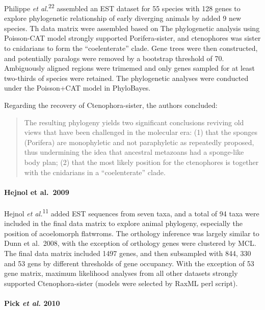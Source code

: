 \documentclass[]{article}
\let\oldparagraph\paragraph
\renewcommand{\paragraph}[1]{\oldparagraph{#1}\mbox{}}
\begin{document}
Philippe \emph{et al.}\textsuperscript{22} assembled an EST dataset for
55 species with 128 genes to explore phylogenetic relationship of early
diverging animals by added 9 new species. Th data matrix were assembled
based on The phylogenetic analysis using Poisson-CAT model strongly
supported Porifera-sister, and ctenophores was sister to cnidarians to
form the ``coelenterate'' clade. Gene trees were then constructed, and
potentially paralogs were removed by a bootstrap threshold of 70.
Ambiguously aligned regions were trimemed and only genes sampled for at
least two-thirds of species were retained. The phylogenetic analyses
were conducted under the Poisson+CAT model in PhyloBayes.

Regarding the recovery of Ctenophora-sister, the authors concluded:

\begin{quote}
The resulting phylogeny yields two significant conclusions reviving old
views that have been challenged in the molecular era: (1) that the
sponges (Porifera) are monophyletic and not paraphyletic as repeatedly
proposed, thus undermining the idea that ancestral metazoans had a
sponge-like body plan; (2) that the most likely position for the
ctenophores is together with the cnidarians in a ``coelenterate'' clade.
\end{quote}

\hypertarget{hejnol-et-al.2009}{%
\paragraph{Hejnol et al.~2009}\label{hejnol-et-al.2009}}

Hejnol \emph{et al.}\textsuperscript{11} added EST sequences from seven
taxa, and a total of 94 taxa were included in the final data matrix to
explore animal phylogeny, especially the position of acoelomorph
flatwroms. The orthology inference was largely similar to Dunn et
al.~2008, with the exception of orthology genes were clustered by MCL.
The final data matrix included 1497 genes, and then subsampled with 844,
330 and 53 gens by different thresholds of gene occupancy. With the
exception of 53 gene matrix, maximum likelihood analyses from all other
datasets strongly supported Ctenophora-sister (models were selected by
RaxML perl script).

\hypertarget{pick-et-al.-2010}{%
\paragraph{\texorpdfstring{Pick \emph{et al.}
2010}{Pick et al. 2010}}\label{pick-et-al.-2010}}
\end{document}
